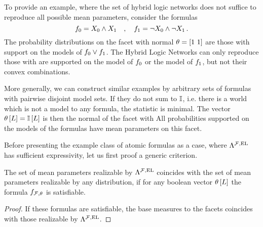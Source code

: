 \begin{example}\label{exa:insufficentHLNsetExpressivity}
	To provide an example, where the set of hybrid logic networks does not suffice to reproduce all possible mean parameters, consider the formulas
		\[ f_{0} = X_{0} \land X_{1} \quad, \quad f_{1} = \lnot X_{0} \land \lnot X_{1} \, . \]
	The probability distributions on the facet with normal $\theta=[1\,\, 1]$ are those with support on the models of $f_{0}\lor f_{1}$.
	The Hybrid Logic Networks can only reproduce those with are supported on the model of $f_{0}$ or the model of $f_{1}$, but not their convex combinations.

	More generally, we can construct similar examples by arbitrary sets of formulas with pairwise disjoint model sets.
	If they do not sum to $\mathbb{I}$, i.e. there is a world which is not a model to any formula, the statistic is minimal.
	The vector $\theta\left[L\right] = \mathbb{I}\left[L\right]$ is then the normal of the facet with
	All probabilities supported on the models of the formulas have mean parameters on this facet.
\end{example}

Before presenting the example class of atomic formulas as a case, where $\Lambda^{\mathcal{F},\mathrm{EL}}$ has sufficient expressivity, let us first proof a generic criterion.

\begin{theorem}\label{the:sufficientHLNExpressivity}
	The set of mean parameters realizable by $\Lambda^{\mathcal{F},\mathrm{EL}}$ coincides with the set of mean parameters realizable by any distribution, if for any boolean vector $\theta\left[L\right]$ the formula $f_{\mathcal{F},\theta}$ is satisfiable.
\end{theorem}
\begin{proof}
		If these formulas are satisfiable, the base measures to the facets coincides with those realizable by $\Lambda^{\mathcal{F},\mathrm{EL}}$.
\end{proof}



